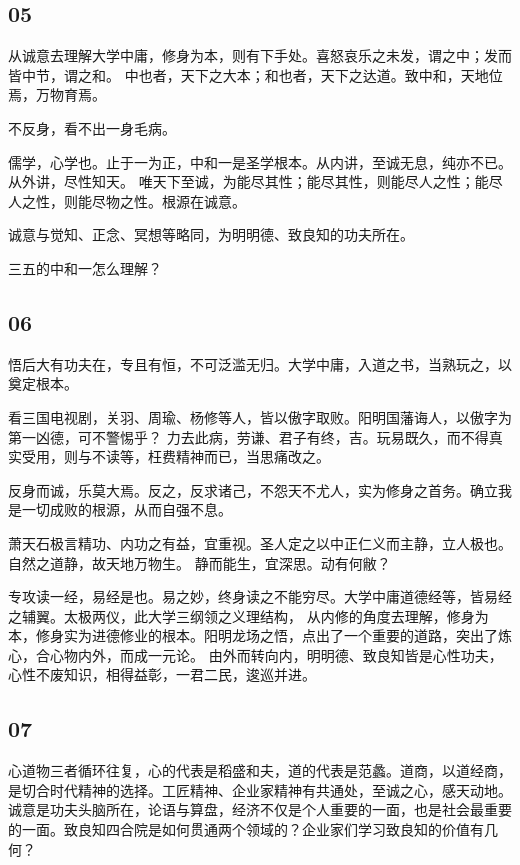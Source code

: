 \subsection{05}

从诚意去理解大学中庸，修身为本，则有下手处。喜怒哀乐之未发，谓之中；发而皆中节，谓之和。
中也者，天下之大本；和也者，天下之达道。致中和，天地位焉，万物育焉。

不反身，看不出一身毛病。

儒学，心学也。止于一为正，中和一是圣学根本。从内讲，至诚无息，纯亦不已。从外讲，尽性知天。
唯天下至诚，为能尽其性；能尽其性，则能尽人之性；能尽人之性，则能尽物之性。根源在诚意。

诚意与觉知、正念、冥想等略同，为明明德、致良知的功夫所在。

三五的中和一怎么理解？

\subsection{06}

悟后大有功夫在，专且有恒，不可泛滥无归。大学中庸，入道之书，当熟玩之，以奠定根本。

看三国电视剧，关羽、周瑜、杨修等人，皆以傲字取败。阳明国藩诲人，以傲字为第一凶德，可不警惕乎？
力去此病，劳谦、君子有终，吉。玩易既久，而不得真实受用，则与不读等，枉费精神而已，当思痛改之。

反身而诚，乐莫大焉。反之，反求诸己，不怨天不尤人，实为修身之首务。确立我是一切成败的根源，从而自强不息。

萧天石极言精功、内功之有益，宜重视。圣人定之以中正仁义而主静，立人极也。自然之道静，故天地万物生。
静而能生，宜深思。动有何敝？

专攻读一经，易经是也。易之妙，终身读之不能穷尽。大学中庸道德经等，皆易经之辅翼。太极两仪，此大学三纲领之义理结构，
从内修的角度去理解，修身为本，修身实为进德修业的根本。阳明龙场之悟，点出了一个重要的道路，突出了炼心，合心物内外，而成一元论。
由外而转向内，明明德、致良知皆是心性功夫，心性不废知识，相得益彰，一君二民，逡巡并进。

\subsection{07}

心道物三者循环往复，心的代表是稻盛和夫，道的代表是范蠡。道商，以道经商，是切合时代精神的选择。工匠精神、企业家精神有共通处，至诚之心，感天动地。
诚意是功夫头脑所在，论语与算盘，经济不仅是个人重要的一面，也是社会最重要的一面。致良知四合院是如何贯通两个领域的？企业家们学习致良知的价值有几何？

